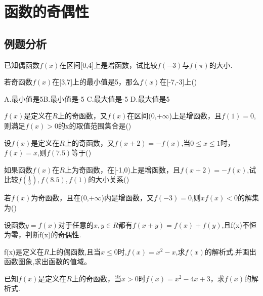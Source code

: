 \chapter{函数的奇偶性}
\section{例题分析}
\begin{example}
	已知偶函数$f(x)$在区间[0,4]上是增函数，试比较$f(-3)$与$f(\pi)$的大小.
\end{example}
\vspace{2.5cm}
\begin{example}
	若奇函数$f(x)$在[3,7]上的最小值是5，那么$f(x)$在[-7,-3]上(\qquad)\par
	A.最小值是5\hfil B.最小值是-5  \hfil  C.最大值是-5   \hfil  D.最大值是5
\end{example}
\begin{example}
$f(x)$是定义在$R$上的奇函数，又$f(x)$在区间(0,+$\infty$)上是增函数，且$f(1)=0$,则满足$f(x)>0$的x的取值范围集合是(\qquad)
\end{example}
\vspace{2.5cm}
\begin{example}
设$f(x)$是定义在$R$上的奇函数，又$f(x+2)=-f(x)$,当$0\leq x \leq 1$时，$f(x)=x$,则$f(7.5)$等于(\qquad) 
\end{example}
\vspace{2.5cm}
\begin{example}
如果函数$f(x)$在$R$上为奇函数，在[-1,0)上是增函数，且$f(x+2)=-f(x)$,试比较$f(\frac{1}{3}),f(8.5),f(1)$的大小关系(\qquad)
\end{example}
\vspace{2.5cm}
\begin{example}
若$f(x)$为奇函数，且在(0,+$\infty$)内是增函数，又$f(-3)=0$,则$xf(x)<0$的解集为(\qquad)
\end{example}
\vspace{2.5cm}
\begin{example}
设函数$y=f(x)$对于任意的$x,y\in R$都有$f(x+y)=f(x)+f(y)$,且f(x)不恒为零，判断f(x)的奇偶性.
\end{example}
\vspace{2.5cm}
\begin{example}
f(x)是定义在$R$上的偶函数,且当$x\leq 0$时,$f(x)=x^2-x$,求$f(x)$的解析式.并画出函数图象,求出函数的值域。
\end{example}
\vspace{2.5cm}
\begin{example}
已知$f(x)$是定义在$R$上的奇函数，当$x>0$时$f(x)=x^2-4x+3$，求$f(x)$的解析式.
\end{example}
